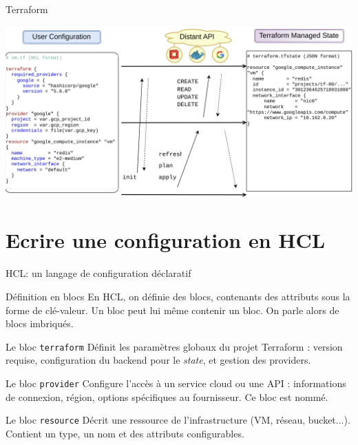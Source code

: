 \documentclass[aspectratio=169,10pt]{beamer}
\begin{document}
\begin{frame}{Terraform}

\includegraphics[scale=0.35]{figures/workflow}

\end{frame}

\section{Ecrire une configuration en HCL}

\begin{frame}{HCL: un langage de configuration déclaratif}

\begin{alertblock}{Définition en blocs}
En HCL, on définie des blocs, contenants des attributs sous la forme de clé-valeur. Un bloc peut lui même contenir un bloc. On parle alors de blocs imbriqués.
\end{alertblock}

\pause

\begin{alertblock}{Le bloc \lstinline[language=HCL]!terraform!}
Définit les paramètres globaux du projet Terraform :  
version requise, configuration du backend pour le \emph{state}, et gestion des providers.
\end{alertblock}

\pause

\begin{alertblock}{Le bloc \lstinline[language=HCL]!provider!}
Configure l'accès à un service cloud ou une API :  
informations de connexion, région, options spécifiques au fournisseur.
Ce bloc est nommé.
\end{alertblock}

\pause

\begin{alertblock}{Le bloc \lstinline[language=HCL]!resource!}
Décrit une ressource de l'infrastructure (VM, réseau, bucket...).  
Contient un type, un nom et des attributs configurables.
\end{alertblock}

\end{frame}
\end{document}
